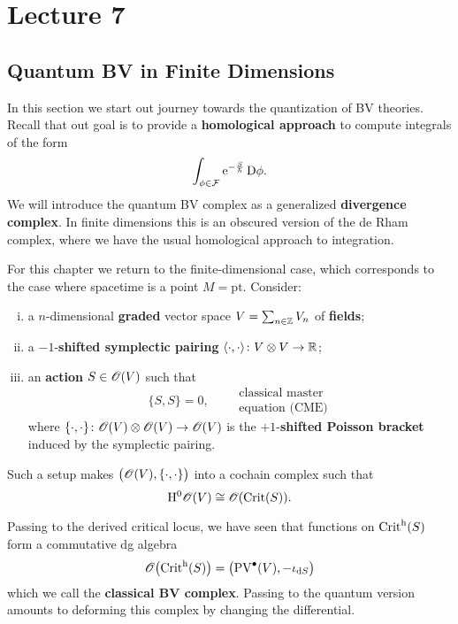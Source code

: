 \chapter{Lecture 7}

\section{Quantum BV in Finite Dimensions}

In this section we start out journey towards the quantization of BV theories.
Recall that out goal is to provide a \textbf{homological approach} to compute integrals of the form
\begin{equation*}
  \int_{\phi \in \mathcal{F}} \mathrm{e}^{- \frac{S}{\hbar}} \, \mathrm{D} \phi.
\end{equation*}
We will introduce the quantum BV complex as a generalized \textbf{divergence complex}.
In finite dimensions this is an obscured version of the de Rham complex, where we have the usual homological approach to integration.

For this chapter we return to the finite-dimensional case, which corresponds to the case where spacetime is a point $M = \text{pt}$. Consider:
\begin{enumerate}[i)]
  \item a $n$-dimensional \textbf{graded} vector space $V = \sum_{n \in \mathbb{Z}} V_n$ of \textbf{fields};
  \item a $-1$-\textbf{shifted symplectic pairing} $\langle \cdot, \cdot \rangle \colon V \otimes V \to \mathbb{R}$;
  \item an \textbf{action} $S \in \mathscr{O}(V)$ such that
    \begin{equation*}
      \{ S, S \} =  0, \qquad \substack{\text{classical master} \\ \text{equation (CME)}}
    \end{equation*}
    where $\{ \cdot, \cdot \} \colon \mathscr{O}(V) \otimes \mathscr{O}(V) \rightarrow \mathscr{O}(V)$ is the $+1$-\textbf{shifted Poisson bracket} induced by the symplectic pairing.
\end{enumerate}
Such a setup makes $\bigl( \mathscr{O}(V), \{ \cdot, \cdot \} \bigr)$ into a cochain complex such that
\begin{equation*}
  \mathrm{H}^0 \mathscr{O}(V) \cong \mathscr{O}( \operatorname{Crit} (S)).
\end{equation*}

Passing to the derived critical locus, we have seen that functions on $\operatorname{Crit}^{\mathrm{h}}(S)$ form a commutative dg algebra
\begin{equation*}
  \mathscr{O} \bigl(\operatorname{Crit}^{\mathrm{h}}(S) \bigr) = \bigl( \operatorname{PV}^{\bullet} (V), -\iota_{\mathrm{d} S} \bigr)
\end{equation*}
which we call the \textbf{classical BV complex}. Passing to the quantum version amounts to deforming this complex by changing the differential.

